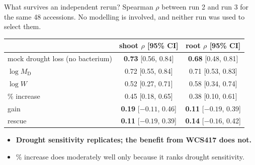 \documentclass[aspectratio=169,11pt]{beamer}
\newcommand{\MD}{M_{\mathrm D}}
\newcommand{\key}[1]{\textcolor{accent}{\textbf{#1}}}
\newcommand{\bad}[1]{\textcolor{warn}{\textbf{#1}}}
\begin{document}
\begin{frame}{What survives an independent rerun?}
  \small Spearman $\rho$ between run 2 and run 3 for the same 48 accessions. No modelling
  is involved, and neither run was used to select them.
  \vspace{0.5em}
  \begin{center}
  \begin{tabular}{lcc}
    \toprule
    & shoot $\rho$ [95\% CI] & root $\rho$ [95\% CI] \\
    \midrule
    mock drought loss (no bacterium) & \key{0.73} [0.56, 0.84] & \key{0.68} [0.48, 0.81] \\
    $\log \MD$ & 0.72 [0.55, 0.84] & 0.71 [0.53, 0.83] \\
    $\log W$ & 0.52 [0.27, 0.71] & 0.58 [0.34, 0.74] \\
    \% increase & 0.45 [0.18, 0.65] & 0.38 [0.10, 0.61] \\
    gain & \bad{0.19} [$-0.11$, 0.46] & \bad{0.11} [$-0.19$, 0.39] \\
    rescue & \bad{0.11} [$-0.19$, 0.39] & \bad{0.14} [$-0.16$, 0.42] \\
    \bottomrule
  \end{tabular}
  \end{center}
  \vspace{0.3em}
  \begin{itemize}
    \item \key{Drought sensitivity replicates; the benefit from WCS417 does not.}
    \item \% increase does moderately well only because it ranks drought sensitivity.
  \end{itemize}
\end{frame}
\end{document}

